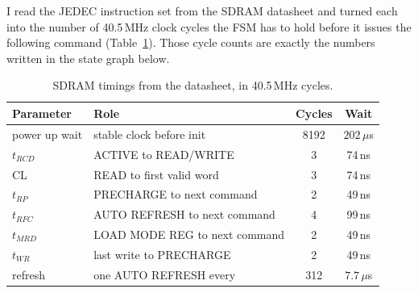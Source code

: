 \documentclass[a4paper,10pt]{article}
\begin{document}
I read the JEDEC instruction set from the SDRAM datasheet
and turned each into the number of 40.5\,MHz clock cycles
the FSM has to hold before it issues the following command (Table~\ref{tab:jedec}).
Those cycle counts are exactly the numbers written in the state graph below.

\begin{table}[H]
\centering
\caption{SDRAM timings from the datasheet, in 40.5\,MHz cycles.}
\label{tab:jedec}
\small
\begin{tabular}{llcc}
\toprule
\textbf{Parameter} & \textbf{Role} & \textbf{Cycles} & \textbf{Wait} \\
\midrule
power up wait & stable clock before init & 8192 & $202\,\mu$s \\
$t_{RCD}$ & ACTIVE to READ/WRITE & 3 & 74\,ns \\
CL & READ to first valid word & 3 & 74\,ns \\
$t_{RP}$ & PRECHARGE to next command & 2 & 49\,ns \\
$t_{RFC}$ & AUTO REFRESH to next command & 4 & 99\,ns \\
$t_{MRD}$ & LOAD MODE REG to next command & 2 & 49\,ns \\
$t_{WR}$ & last write to PRECHARGE & 2 & 49\,ns \\
refresh & one AUTO REFRESH every & 312 & $7.7\,\mu$s \\
\bottomrule
\end{tabular}
\end{table}
\end{document}
